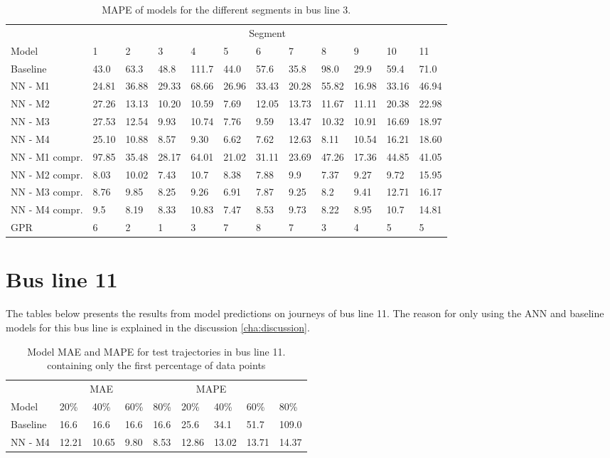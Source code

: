 \begin{table}[H]
  \centering
  \caption{MAPE of models for the different segments in bus line 3.}
  \label{fig:model-mape-of-segs-203}
\begin{tabular}{ l | l | l | l | l | l | l | l | l | l | l | l }
	& \multicolumn{11}{c}{Segment} \\
	Model       & 1 & 2 & 3 & 4 & 5 & 6 & 7 & 8 & 9 & 10 & 11 \\
	\hline
	Baseline  & 43.0 & 63.3 & 48.8 & 111.7 & 44.0 & 57.6 & 35.8 & 98.0 & 29.9 & 59.4  & 71.0 \\
	NN - M1         & 24.81& 36.88& 29.33& 68.66& 26.96& 33.43& 20.28& 55.82& 16.98& 33.16& 46.94 \\
    	NN - M2         & 27.26 & 13.13 & 10.20 & 10.59 &  7.69 & 12.05 &  13.73 & 11.67 & 11.11 & 20.38  & 22.98\\
    	NN - M3         & 27.53 & 12.54 & 9.93 & 10.74 &  7.76 & 9.59 &  13.47 & 10.32 & 10.91 & 16.69  & 18.97\\
    	NN - M4         & 25.10 & 10.88 & 8.57 & 9.30 &  6.62 & 7.62 &  12.63 & 8.11 & 10.54 & 16.21  & 18.60\\
    	NN - M1 compr.         & 97.85& 35.48& 28.17& 64.01& 21.02& 31.11& 23.69& 47.26& 17.36& 44.85& 41.05 \\ 
    	NN - M2 compr.         & 8.03& 10.02& 7.43& 10.7& 8.38& 7.88& 9.9& 7.37& 9.27& 9.72& 15.95 \\
    	NN - M3 compr.         & 8.76& 9.85& 8.25& 9.26& 6.91& 7.87& 9.25& 8.2& 9.41& 12.71& 16.17 \\
    	NN - M4 compr.         & 9.5& 8.19& 8.33& 10.83& 7.47& 8.53& 9.73& 8.22& 8.95& 10.7& 14.81 \\
	GPR         & 6 & 2 & 1 & 3 &  7 & 8 &  7 & 3 & 4 & 5  & 5 \\
\end{tabular}
\end{table}

\section{Bus line 11}
The tables below presents the results from model predictions on journeys of bus line 11. The reason for only using the ANN and baseline models for this bus line is explained in the discussion \ref{cha:discussion}.
\begin{table}[H]
	\centering
	\caption{Model MAE and MAPE for test trajectories in bus line 11. containing only the first percentage of data points}
	\label{tbl:models-mae-and-mape-211}
	\begin{tabular}{l | l | l | l | l || l | l | l | l }
		& \multicolumn{3}{c}{MAE} & \multicolumn{4}{c}{MAPE} \\
		Model      & 20\% & 40\% & 60\% & 80\% & 20\% & 40\% & 60\% & 80\% \\
		\hline
		Baseline & 16.6 & 16.6 & 16.6 & 16.6  & 25.6 & 34.1 & 51.7 & 109.0 \\
		NN - M4        & 12.21 &  10.65 & 9.80 &  8.53  & 12.86 & 13.02 & 13.71 & 14.37 \\
	\end{tabular}
\end{table}


